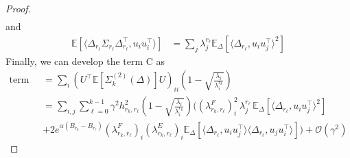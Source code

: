 \documentclass[11pt]{article}
\newcommand{\EE}{\mathbb{E}}
\begin{document}
\begin{proof}
\begin{align*}
\end{align*}
and 
\begin{align*}
 \EE[\langle \Delta_{r_\ell}  \Sigma_{r_\ell}  \Delta_{r_\ell}^\top, u_i u_i^\top \rangle ]  &= \sum_j \lambda^{r_\ell}_j  \EE_{\Delta}\left[\langle \Delta_{r_\ell}, u_i u_j^\top \rangle^2 \right] %
\end{align*}
Finally, we can develop the term C as
\begin{align*}
   \text{term C} 
     &=  \sum_i \left( U^\top \EE \left[ \Sigma^{(2)}_{k}(\Delta) \right] U \right)_{ii}\left( 1 - \sqrt{\frac{\lambda_i}{\lambda^{r_k}_i }} \right) \\
     &= \sum_{i,j}  \sum_{\ell=0}^{k-1} \gamma^2 h_{r_k,r_{\ell}}^2 \left( 1 - \sqrt{\frac{\lambda_i}{\lambda^{r_k}_i }}\right) \Biggl((\lambda^F_{r_k,r_{\ell}})^2_i \, \lambda^{r_\ell}_j \, \EE_{\Delta}\left[\langle \Delta_{r_\ell}, u_i u_j^\top \rangle^2 \right] \\
     &+ 2 e^{\alpha(B_{r_k}- B_{r_\ell})}  (\lambda^F_{r_k,r_{\ell}})_i  (\lambda^E_{r_k,r_{\ell}})_i \EE_{\Delta}\left[\langle \Delta_{r_\ell}, u_i u_j^\top \rangle \langle \Delta_{r_\ell}, u_j u_i^\top \rangle \right] \Biggr) + \mathcal{O}(\gamma^2) \nonumber
\end{align*}

\end{proof}
\end{document}
